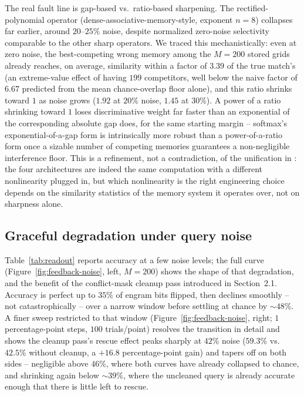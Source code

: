 \documentclass[11pt]{article}
\begin{document}
The real fault line is gap-based vs.\ ratio-based sharpening. The rectified-polynomial
operator (dense-associative-memory-style, exponent $n=8$) collapses far earlier, around
$20$--$25\%$ noise, despite normalized zero-noise selectivity comparable to the other sharp
operators. We traced this mechanistically: even at zero noise, the best-competing wrong memory
among the $M{=}200$ stored grids already reaches, on average, similarity within a factor of
$3.39$ of the true match's (an extreme-value effect of having $199$ competitors, well below the
naive factor of $6.67$ predicted from the mean chance-overlap floor alone), and this ratio
shrinks toward $1$ as noise grows ($1.92$ at $20\%$ noise, $1.45$ at $30\%$). A power of a
ratio shrinking toward $1$ loses discriminative weight far faster than an exponential of the
corresponding absolute gap does, for the same starting margin -- softmax's exponential-of-a-gap
form is intrinsically more robust than a power-of-a-ratio form once a sizable number of
competing memories guarantees a non-negligible interference floor. This is a refinement, not a
contradiction, of the unification in \cite{gershman2025}: the four architectures are indeed the
same computation with a different nonlinearity plugged in, but which nonlinearity is the right
engineering choice depends on the similarity statistics of the memory system it operates over,
not on sharpness alone.

\subsection{Graceful degradation under query noise}
\label{sec:graceful-noise}

Table~\ref{tab:readout} reports accuracy at a few noise levels; the full curve
(Figure~\ref{fig:feedback-noise}, left, $M=200$) shows the shape of that degradation, and
the benefit of the conflict-mask cleanup pass introduced in Section~2.1. Accuracy is perfect
up to $35\%$ of engram bits flipped, then declines smoothly -- not catastrophically -- over a
narrow window before settling at chance by ${\sim}48\%$. A finer sweep restricted to that
window (Figure~\ref{fig:feedback-noise}, right; $1$ percentage-point steps, $100$
trials/point) resolves the transition in detail and shows the cleanup pass's rescue effect
peaks sharply at $42\%$ noise ($59.3\%$ vs.\ $42.5\%$ without cleanup, a $+16.8$
percentage-point gain) and tapers off on both sides -- negligible above $46\%$, where both
curves have already collapsed to chance, and shrinking again below $\sim39\%$, where the
uncleaned query is already accurate enough that there is little left to rescue.
\end{document}
